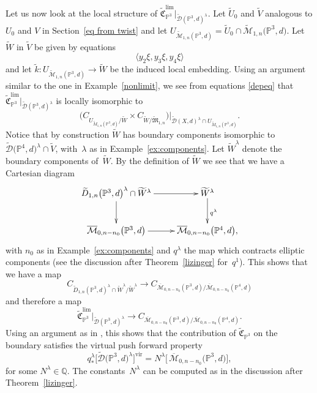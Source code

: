 \documentclass[pdftex]{sigma}
\numberwithin{equation}{section}
\newcommand{\vv}{\mathrm{vir}}
\newcommand{\PP}{\mathbb P}
\begin{document}
\begin{Remark}
Let us now look at the local structure of $\widetilde{\mathfrak{C}}_{\PP^3}^{\mathrm{lim}}|_{\widetilde{\mathcal{D}}(\PP^3,d)^{\lambda}}$. Let $\widetilde{U}_0$ and $\widetilde{V}$ analogous to $U_0$ and $V$ in Section~\ref{eq from twist} and let $U_{\widetilde{\mathcal{M}}_{1,n}(\PP^3,d)}=\widetilde{U}_0\cap \widetilde{\mathcal{M}}_{1,n}\big(\PP^3,d\big)$. Let $\widetilde{W}$ in $\widetilde{V}$ be given by equations
\[\langle y_2\xi,y_3\xi,y_4\xi \rangle
\]
and let $\tilde{k}\colon U_{\widetilde{\mathcal{M}}_{1,n}(\PP^3,d)}\to \widetilde{W}$ be the induced local embedding. Using an argument similar to the one in Example~\ref{nonlimit}, we see from equations \ref{depeq} that $\widetilde{\mathfrak{C}}_{\PP^3}^{\mathrm{lim}}|_{\widetilde{\mathcal{D}}(\PP^3,d)^{\lambda}}$ is locally isomorphic to
\[
\big(C_{U_{\widetilde{M}_{1,n}(\PP^3,d)}/\widetilde{W}}\times C_{\widetilde{W}/\widetilde{\mathfrak{M}}_{1,n}}\big)|_{\widetilde{\mathcal{D}}(X,d)^{\lambda}\cap U_{\widetilde{M}_{1,n}(\PP^3,d)}}.
\]
Notice that by construction $\widetilde{W}$ has boundary components isomorphic to $\widetilde{\mathcal{D}}\big(\PP^4,d\big)^{\lambda}\cap \widetilde{V}$, with~$\lambda$ as in Example~\ref{ex:components}. Let $\widetilde{W}^{\lambda}$ denote the boundary components of~$\widetilde{W}$. By the definition of $\widetilde{W}$ we see that we have a Cartesian diagram
\[\xymatrix{
\widetilde{D}_{1,n}\big(\PP^3,d\big)^{\lambda}\cap \widetilde{W}^{\lambda}\ar[r]\ar[d] &\widetilde{W}^{\lambda}\ar[d]^{q^{\lambda}}\\
\overline{\mathcal{M}}_{0,n-n_0}\big(\PP^3,d\big)\ar[r]&\overline{\mathcal{M}}_{0,n-n_0}\big(\PP^4,d\big),
}
\]
with $n_0$ as in Example~\ref{ex:components} and $q^{\lambda}$ the map which contracts elliptic components (see the discussion after Theorem~\ref{lizinger} for~$q^1$). This shows that we have a map
\[C_{\widetilde{D}_{1,n}(\PP^3,d)^{\lambda}\cap \widetilde{W}^{\lambda}/\widetilde{W}^{\lambda}}\to C_{\overline{\mathcal{M}}_{0,n-n_0}(\PP^3,d)/\overline{\mathcal{M}}_{0,n-n_0}(\PP^4,d)}
\]
and therefore a map
\[
\widetilde{\mathfrak{C}}^{\mathrm{lim}}_{\PP^3}|_{\widetilde{\mathcal{D}}(\PP^3,d)^{\lambda}}\to C_{\overline{\mathcal{M}}_{0,n-n_0}(\PP^3,d)/\overline{\mathcal{M}}_{0,n-n_0}(\PP^4,d)}.
\]
Using an argument as in \cite[Lemma~4.4]{vir-push}, this shows that the contribution of $\widetilde{\mathfrak{C}}_{\PP^3}$ on the boundary satisfies the virtual push forward property
\[q^{\lambda}_*\big[\widetilde{\mathcal{D}}\big(\PP^3,d\big)^{\lambda}\big]^{\vv}=N^{\lambda} \big[\,\overline{\mathcal{M}}_{0,n-n_0}\big(\PP^3,d\big)\big],
\]
for some $N^{\lambda}\in \mathbb Q$. The constants~$N^{\lambda}$ can be computed as in the discussion after Theorem~\ref{lizinger}.


\end{Remark}
\end{document}
